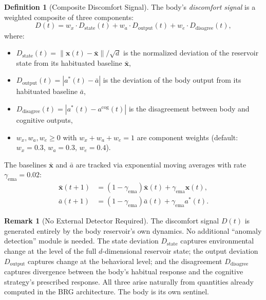 \documentclass[11pt,a4paper]{article}
\theoremstyle{definition}
\newtheorem{definition}[theorem]{Definition}
\newtheorem{remark}[theorem]{Remark}
\newcommand{\xstate}{\mathbf{x}}
\newcommand{\acog}{a^{\mathrm{cog}}}
\newcommand{\abody}{a^{*}}
\begin{document}
\begin{definition}[Composite Discomfort Signal]
\label{def:discomfort}
The body's \emph{discomfort signal} is a weighted composite of three
components:
\begin{equation}
\label{eq:discomfort}
D(t) = w_x \cdot D_{\mathrm{state}}(t) + w_a \cdot D_{\mathrm{output}}(t)
  + w_e \cdot D_{\mathrm{disagree}}(t),
\end{equation}
where:
\begin{itemize}[nosep]
  \item $D_{\mathrm{state}}(t) = \|\xstate(t) - \bar{\xstate}\| / \sqrt{d}$
    is the normalized deviation of the reservoir state from its habituated
    baseline $\bar{\xstate}$,
  \item $D_{\mathrm{output}}(t) = |\abody(t) - \bar{a}|$
    is the deviation of the body output from its habituated baseline
    $\bar{a}$,
  \item $D_{\mathrm{disagree}}(t) = |\abody(t) - \acog(t)|$
    is the disagreement between body and cognitive outputs,
  \item $w_x, w_a, w_e \geq 0$ with $w_x + w_a + w_e = 1$ are component
    weights (default: $w_x = 0.3$, $w_a = 0.3$, $w_e = 0.4$).
\end{itemize}
The baselines $\bar{\xstate}$ and $\bar{a}$ are tracked via exponential
moving averages with rate $\gamma_{\mathrm{ema}} = 0.02$:
\begin{align}
\bar{\xstate}(t+1) &= (1 - \gamma_{\mathrm{ema}}) \bar{\xstate}(t)
  + \gamma_{\mathrm{ema}} \xstate(t), \\
\bar{a}(t+1) &= (1 - \gamma_{\mathrm{ema}}) \bar{a}(t)
  + \gamma_{\mathrm{ema}} \abody(t).
\end{align}
\end{definition}

\begin{remark}[No External Detector Required]
The discomfort signal $D(t)$ is generated entirely by the body reservoir's
own dynamics.  No additional ``anomaly detection'' module is needed.
The state deviation $D_{\mathrm{state}}$ captures environmental change
at the level of the full $d$-dimensional reservoir state; the output
deviation $D_{\mathrm{output}}$ captures change at the behavioral level;
and the disagreement $D_{\mathrm{disagree}}$ captures divergence between
the body's habitual response and the cognitive strategy's prescribed response.
All three arise naturally from quantities already computed in the BRG
architecture.  The body is its own sentinel.
\end{remark}
\end{document}
